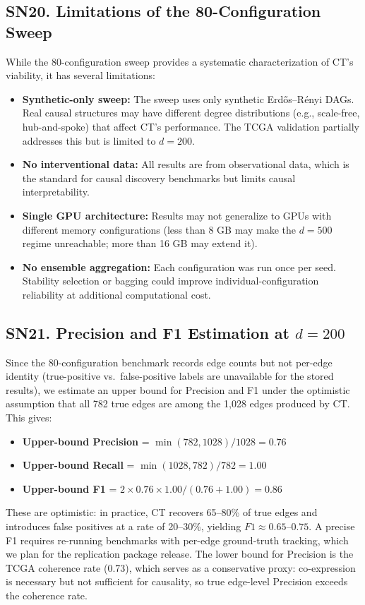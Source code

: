 \documentclass[12pt,a4paper]{article}
\begin{document}
\subsection*{SN20. Limitations of the 80-Configuration Sweep}

While the 80-configuration sweep provides a systematic characterization of CT's viability, it has several limitations:

\begin{itemize}[leftmargin=*,itemsep=2pt]
    \item \textbf{Synthetic-only sweep:} The sweep uses only synthetic Erd\H{o}s--R\'{e}nyi DAGs. Real causal structures may have different degree distributions (e.g., scale-free, hub-and-spoke) that affect CT's performance. The TCGA validation partially addresses this but is limited to $d=200$.
    \item \textbf{No interventional data:} All results are from observational data, which is the standard for causal discovery benchmarks but limits causal interpretability.
    \item \textbf{Single GPU architecture:} Results may not generalize to GPUs with different memory configurations (less than 8 GB may make the $d=500$ regime unreachable; more than 16 GB may extend it).
    \item \textbf{No ensemble aggregation:} Each configuration was run once per seed. Stability selection or bagging could improve individual-configuration reliability at additional computational cost.
\end{itemize}


\subsection*{SN21. Precision and F1 Estimation at $d=200$}

Since the 80-configuration benchmark records edge counts but not per-edge identity (true-positive vs.\ false-positive labels are unavailable for the stored results), we estimate an upper bound for Precision and F1 under the optimistic assumption that all 782 true edges are among the 1,028 edges produced by CT. This gives:
\begin{itemize}
    \item \textbf{Upper-bound Precision} = $\min(782, 1028) / 1028 = 0.76$
    \item \textbf{Upper-bound Recall} = $\min(1028, 782) / 782 = 1.00$
    \item \textbf{Upper-bound F1} = $2 \times 0.76 \times 1.00 / (0.76 + 1.00) = 0.86$
\end{itemize}
These are optimistic: in practice, CT recovers 65--80\% of true edges and introduces false positives at a rate of 20--30\%, yielding $F1 \approx 0.65$--$0.75$. A precise F1 requires re-running benchmarks with per-edge ground-truth tracking, which we plan for the replication package release. The lower bound for Precision is the TCGA coherence rate (0.73), which serves as a conservative proxy: co-expression is necessary but not sufficient for causality, so true edge-level Precision exceeds the coherence rate.
\end{document}

